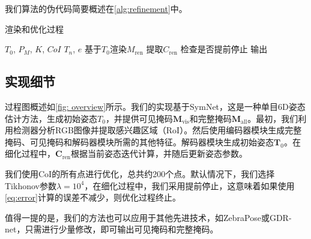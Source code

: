 我们算法的伪代码简要概述在\autoref{alg:refinement}中。

\begin{algorithm}[!h]
    \caption{渲染和优化过程}
    \label{alg:refinement}
    \renewcommand{\algorithmicrequire}{\textbf{输入:}}
    \renewcommand{\algorithmicensure}{\textbf{输出:}}
    
    \begin{algorithmic}[1]
        \REQUIRE $T_0$, $P_M$, $K$, $CoI$
        \ENSURE $T_n$, $e$    %
        \STATE 基于$T_0$渲染$M_\text{ren}$
        \STATE 提取$C_\text{ren}$
    \STATE 检查是否提前停止
    \ENDFOR
        \RETURN 输出
    \end{algorithmic}
\end{algorithm}

\subsection{实现细节}

过程图概述如\autoref{fig: overview}所示。我们的实现基于SymNet\cite{symnet}，这是一种单目6D姿态估计方法，生成初始姿态$T_0$，并提供可见掩码$\mathbf{M}_\text{vis}$和完整掩码$\mathbf{M}_\text{all}$。最初，我们利用检测器分析RGB图像并提取感兴趣区域（RoI）。然后使用编码器模块生成完整掩码、可见掩码和解码器模块所需的其他特征。解码器模块生成初始姿态$\mathbf{T}_0$。在细化过程中，$\mathbf{C}_\text{ren}$根据当前姿态迭代计算，并随后更新姿态参数。

我们使用CoI的所有点进行优化，总共约200个点。默认情况下，我们选择Tikhonov参数$\lambda = 10^4$，在细化过程中，我们采用提前停止，这意味着如果使用\autoref{eq:error}计算的误差不减少，则优化过程终止。

值得一提的是，我们的方法也可以应用于其他先进技术，如ZebraPose\cite{su2022zebrapose}或GDR-net\cite{wang2021gdr}，只需进行少量修改，即可输出可见掩码和完整掩码。
